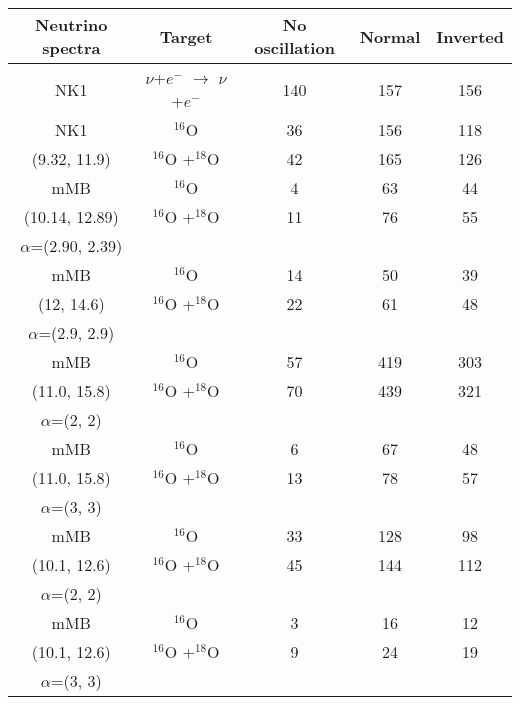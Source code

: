 \documentclass[preprint,12pt]{elsarticle}
\begin{document}
\begin{table}[htbp]
\begin{center}
\begin{tabular}{|c|c|c|c|c|}
\hline
Neutrino spectra & Target& No oscillation & Normal & Inverted \\
\hline\hline
 NK1 \cite{Naka2013} & $\nu$+$e^{-}$ $\rightarrow$ $\nu$+$e^{-}$  & 140 & 157 & 156 \\
\hline
NK1 \cite{Naka2013} & $^{16}$O  & 36  & 156 & 118 \\
(9.32, 11.9) &$^{16}$O +$^{18}$O  & 42 & 165 & 126 \\
\hline
\hline
mMB \cite{Tambora} & $^{16}$O & 4 & 63 & 44 \\
(10.14, 12.89) & $^{16}$O +$^{18}$O & 11 & 76 & 55 \\
$\alpha$=(2.90, 2.39) & & & & \\
\hline
mMB & $^{16}$O & 14 & 50 & 39 \\
(12, 14.6) & $^{16}$O +$^{18}$O & 22 & 61 & 48 \\
$\alpha$=(2.9, 2.9) & & & & \\
\hline
mMB & $^{16}$O & 57 & 419 & 303 \\
(11.0, 15.8) & $^{16}$O +$^{18}$O & 70 & 439 & 321 \\
$\alpha$=(2, 2) & & & & \\
\hline
mMB & $^{16}$O & 6 & 67 & 48 \\
(11.0, 15.8) & $^{16}$O +$^{18}$O & 13 & 78 & 57 \\
$\alpha$=(3, 3) & & & & \\
\hline
mMB & $^{16}$O & 33 & 128 & 98 \\
(10.1, 12.6) & $^{16}$O +$^{18}$O & 45 & 144 & 112 \\
$\alpha$=(2, 2) & & & & \\
\hline
mMB & $^{16}$O & 3 & 16 & 12 \\
(10.1, 12.6) & $^{16}$O +$^{18}$O & 9 & 24 & 19 \\
$\alpha$=(3, 3) & & & & \\
\hline

\end{tabular}
\end{center}
\end{table}
\end{document}
